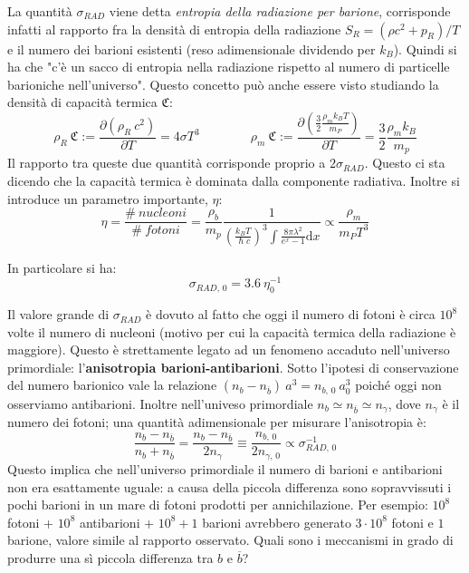 La quantità $\sigma_{RAD}$ viene detta \textit{entropia della radiazione per barione}, corrisponde infatti al rapporto fra la densità di entropia della radiazione $S_R= (\rho c^2 + p_R)/T$ e il numero dei barioni esistenti (reso adimensionale dividendo per $k_B$). Quindi si ha che "c'è un sacco di entropia nella radiazione rispetto al numero di particelle barioniche nell'universo". Questo concetto può anche essere visto studiando la densità di capacità termica $\mathfrak{C}$:
$$
\rho_R ~\mathfrak{C}:=\frac{\partial \left (\rho_R ~c^2  \right )}{\partial T}=4\sigma T^3 \qquad\qquad \rho_m ~\mathfrak{C}:=\frac{\partial\left ( \frac{3}{2}\frac{\rho_m k_B T}{m_P}  \right )}{\partial T} = \frac{3}{2}\frac{\rho_m k_B}{m_p}
$$
Il rapporto tra queste due quantità corrisponde proprio a $2\sigma_{RAD}$. Questo ci sta dicendo che la capacità termica è dominata dalla componente radiativa.
Inoltre si introduce un parametro importante, $\eta$:
\begin{equation}
    \eta = \frac{\# ~nucleoni}{\# ~fotoni} = \frac{\rho_b}{m_p} \frac{1}{ \left( \frac{k_B T}{\hslash c}\right)^3 \int \frac{8 \pi \lambda^2}{e^x - 1} \mathrm{d}x} \propto \frac{\rho_m}{m_P T^3}
\end{equation}

In particolare si ha:
\begin{equation}
    \sigma_{RAD, \, 0 } = 3.6 ~ \eta_0^{-1}
\end{equation}

Il valore grande di $\sigma_{RAD}$ è dovuto al fatto che oggi il numero di fotoni è circa $10^8$ volte il numero di nucleoni (motivo per cui la capacità termica della radiazione è maggiore). Questo è strettamente legato ad un fenomeno accaduto nell'universo primordiale: l'\textbf{anisotropia barioni-antibarioni}. Sotto l'ipotesi di conservazione del numero barionico vale la relazione $(n_b - n_{\overbar{b}} )~a^3 = n_{b, \,0}~a_0^3$ poiché oggi non osserviamo antibarioni. Inoltre nell'univeso primordiale $n_b \simeq n_{\overbar{b}} \simeq n_\gamma $, dove $n_\gamma $ è il numero dei fotoni; una quantità adimensionale per misurare l'anisotropia è:
\begin{equation}
    \frac{n_b - n_{\overbar{b}}}{n_b + n_{\overbar{b}}}= \frac{n_b - n_{\overbar{b}}}{2 n_\gamma} \equiv \frac{n_{b, \,0}}{2n_{\gamma, \,0}} \propto \sigma_{RAD, \, 0 }^{-1}
\end{equation}
Questo implica che nell'universo primordiale il numero di barioni e antibarioni non era esattamente uguale: a causa della piccola differenza sono sopravvissuti i pochi barioni in un mare di fotoni prodotti per annichilazione. Per esempio: $10^8$ fotoni + $10^8$ antibarioni + $10^8 +1 $ barioni avrebbero generato $3\cdot 10^8$ fotoni e $1$ barione, valore simile al rapporto osservato. Quali sono i meccanismi in grado di produrre una sì piccola differenza tra $b$ e $\overbar{b}$?

